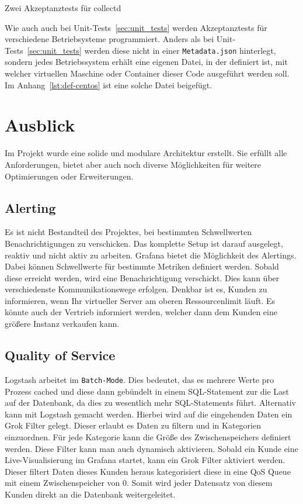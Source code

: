 \begin{listing}
  \inputminted{ruby}{../listings/acceptance-test.txt}
  \caption{Zwei Akzeptanztests für collectd}
\end{listing}

Wie auch auch bei Unit-Tests~\ref{sec:unit_tests} werden Akzeptanztests für
verschiedene Betriebsysteme programmiert. Anders als bei
Unit-Tests~\ref{sec:unit_tests} werden diese nicht in einer
\texttt{Metadata.json} hinterlegt, sondern jedes Betriebssystem erhält eine
eigenen Datei, in der definiert ist, mit welcher virtuellen Maschine oder
Container dieser Code ausgeführt werden soll. Im Anhang~\ref{lst:def-centos}
ist eine solche Datei beigefügt.
\mr%

\chapter{Ausblick}
\label{chapter:ausblick}
Im Projekt wurde eine solide und modulare Architektur erstellt. Sie erfüllt
alle Anforderungen, bietet aber auch noch diverse Möglichkeiten für
weitere Optimierungen oder Erweiterungen.
\tm%

\section{Alerting}
Es ist nicht Bestandteil des Projektes, bei bestimmten Schwellwerten
Benachrichtigungen zu verschicken. Das komplette Setup ist darauf ausgelegt,
reaktiv und nicht aktiv zu arbeiten. Grafana bietet die Möglichkeit des
Alertings. Dabei können Schwellwerte für bestimmte Metriken definiert werden.
Sobald diese erreicht werden, wird eine Benachrichtigung verschickt. Dies kann
über verschiedenste Kommunikationswege erfolgen. Denkbar ist es, Kunden zu
informieren, wenn Ihr virtueller Server am oberen Ressourcenlimit läuft. Es
könnte auch der Vertrieb informiert werden, welcher dann dem Kunden eine
größere Instanz verkaufen kann.
\tm%

\section{Quality of Service}
Logstash arbeitet im \texttt{Batch-Mode}. Dies bedeutet, das es mehrere Werte
pro Prozess cached und diese dann gebündelt in einem SQL-Statement zur
die Last auf der Datenbank, da dies zu wesentlich mehr SQL-Statements führt.
Alternativ kann mit Logstash  gemacht werden.
Hierbei wird auf die eingehenden Daten ein \gls{Grok} Filter gelegt. Dieser
erlaubt es Daten zu filtern und in Kategorien einzuordnen. Für jede Kategorie
kann die Größe des Zwischenspeichers definiert werden. Diese Filter kann man
auch dynamisch aktivieren. Sobald ein Kunde eine Live-Visualisierung im Grafana
startet, kann ein Grok Filter aktiviert werden. Dieser filtert Daten dieses
Kunden heraus kategorisiert diese in eine QoS Queue mit einem Zwischenspeicher
von 0. Somit wird jeder Datensatz von diesem Kunden direkt an die Datenbank
weitergeleitet.
\tm%

